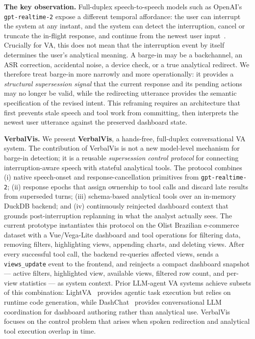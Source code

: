 \documentclass[journal]{IEEEtran}
\begin{document}
\textbf{The key observation.}
Full-duplex speech-to-speech models such as OpenAI's \texttt{gpt-realtime-2} expose a different temporal affordance: the user can interrupt the system at any instant, and the system can detect the interruption, cancel or truncate the in-flight response, and continue from the newest user input~\cite{openai_realtime_docs}. Crucially for VA, this does not mean that the interruption event by itself determines the user's analytical meaning. A barge-in may be a backchannel, an ASR correction, accidental noise, a device check, or a true analytical redirect. We therefore treat barge-in more narrowly and more operationally: it provides a \emph{structural supersession signal} that the current response and its pending actions may no longer be valid, while the redirecting utterance provides the semantic specification of the revised intent. This reframing requires an architecture that first prevents stale speech and tool work from committing, then interprets the newest user utterance against the preserved dashboard state.

\textbf{VerbalVis.}
We present \textbf{VerbalVis}, a hands-free, full-duplex conversational VA system. The contribution of VerbalVis is not a new model-level mechanism for barge-in detection; it is a reusable \emph{supersession control protocol} for connecting interruption-aware speech with stateful analytical tools. The protocol combines (i) native speech-onset and response-cancellation primitives from \texttt{gpt-realtime-2}; (ii) response epochs that assign ownership to tool calls and discard late results from superseded turns; (iii) schema-based analytical tools over an in-memory DuckDB backend; and (iv) continuously reinjected dashboard context that grounds post-interruption replanning in what the analyst actually sees. The current prototype instantiates this protocol on the Olist Brazilian e-commerce dataset with a Vue/Vega-Lite dashboard and tool operations for filtering data, removing filters, highlighting views, appending charts, and deleting views. After every successful tool call, the backend re-queries affected views, sends a \texttt{views\_update} event to the frontend, and reinjects a compact dashboard snapshot --- active filters, highlighted view, available views, filtered row count, and per-view statistics --- as system context. Prior LLM-agent VA systems achieve subsets of this combination: LightVA~\cite{zhao2024lightva} provides agentic task execution but relies on runtime code generation, while DashChat~\cite{cheng2026dashchat} provides conversational LLM coordination for dashboard authoring rather than analytical use. VerbalVis focuses on the control problem that arises when spoken redirection and analytical tool execution overlap in time.
\end{document}
